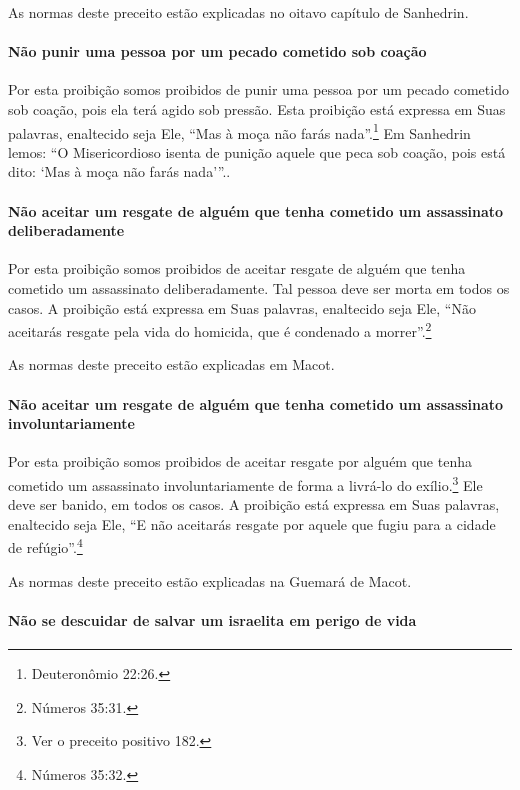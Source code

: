 As normas deste preceito estão explicadas no oitavo capítulo de Sanhedrin.

\paragraph{Não punir uma pessoa por um pecado cometido sob coação}

Por esta proibição somos proibidos de punir uma pessoa por um pecado
cometido sob coação, pois ela terá agido sob pressão. Esta proibição
está expressa em Suas palavras, enaltecido seja Ele, ``Mas à moça não
farás nada''.\footnote{Deuteronômio 22:26.} Em Sanhedrin lemos: ``O
Misericordioso isenta de punição aquele que peca sob coação, pois está
dito: `Mas à moça não farás nada'''..

\paragraph{Não aceitar um resgate de alguém que tenha cometido um assassinato deliberadamente}

Por esta proibição somos proibidos de aceitar resgate de alguém que
tenha cometido um assassinato deliberadamente. Tal pessoa deve ser morta
em todos os casos. A proibição está expressa em Suas palavras, enaltecido
seja Ele, ``Não aceitarás resgate pela vida do homicida, que é condenado
a morrer''.\footnote{Números 35:31.}

As normas deste preceito estão explicadas em Macot.

\paragraph{Não aceitar um resgate de alguém que tenha cometido um assassinato involuntariamente}

Por esta proibição somos proibidos de aceitar resgate por alguém que
tenha cometido um assassinato involuntariamente de forma a livrá-lo do
exílio.\footnote{Ver o preceito positivo 182.} Ele deve ser banido, em todos os casos. A
proibição está expressa em Suas palavras, enaltecido seja Ele, ``E não
aceitarás resgate por aquele que fugiu para a cidade de refúgio''.\footnote{Números 35:32.}

As normas deste preceito estão explicadas na Guemará de Macot.

\paragraph{Não se descuidar de salvar um israelita em perigo de vida}

